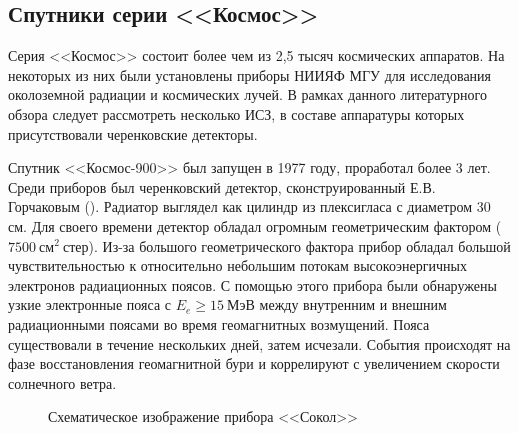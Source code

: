 \documentclass[12pt,a4paper]{report} %
\begin{document}
\subsection{Спутники серии <<Космос>>}
Серия <<Космос>> состоит более чем из 2,5 тысяч космических аппаратов. На некоторых из них были установлены приборы НИИЯФ МГУ для исследования околоземной радиации и космических лучей. 
В рамках данного литературного обзора следует рассмотреть несколько ИСЗ, в составе аппаратуры которых присутствовали черенковские детекторы. 

Спутник <<Космос-900>> был запущен в 1977 году, проработал более 3 лет. Среди приборов был черенковский детектор, сконструированный Е.В. Горчаковым (\cite{KOSMOS900}).
Радиатор выглядел как цилиндр из плексигласа с диаметром 30 см. 
Для своего времени детектор обладал огромным геометрическим фактором ($7500~см^2~ стер$).
Из-за большого геометрического фактора прибор обладал большой чувствительностью к относительно небольшим потокам высокоэнергичных электронов радиационных поясов.
С помощью этого прибора были обнаружены  узкие электронные пояса с $E_e\geq15~МэВ$ между внутренним и внешним радиационными поясами во время геомагнитных возмущений. Пояса существовали в течение нескольких дней, затем исчезали. События происходят на фазе восстановления геомагнитной бури и коррелируют с увеличением скорости солнечного ветра.
\begin{figure}[th]
	\noindent{}
	\caption{Схематическое изображение прибора <<Сокол>>}
	\label{picSOKOL}
\end{figure}
\end{document}
